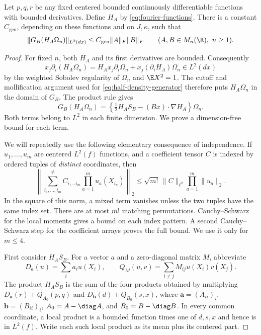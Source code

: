 \begin{lemma}
\label{lem:fourier-generator-bound}
Let $p,q,r$ be any fixed centered bounded continuously differentiable
functions with bounded derivatives.  Define $H_A$ by
\eqref{eq:fourier-functions}.  There is a constant $C_{\mathrm{gen}}$,
depending on these functions and on $J,\kappa$, such that
\begin{equation}
 \|G_B(H_A\Omega_n)\|_{L^2(dx)}
 \le C_{\mathrm{gen}}\|A\|_F\|B\|_F
 \qquad(A,B\in M_n(\R),\ n\ge1).
 \label{eq:coordinate-function-generator-bound}
\end{equation}
\end{lemma}

\begin{proof}
For fixed $n$, both $H_A$ and its first derivatives are bounded.
Consequently
\[
 x_j\partial_i(H_A\Omega_n)
 =H_Ax_j\partial_i\Omega_n
       +x_j(\partial_iH_A)\Omega_n\in L^2(dx)
\]
by the weighted Sobolev regularity of $\Omega_n$ and
$\E X^2=1$.  The cutoff and mollification argument used for
\eqref{eq:half-density-generator} therefore puts $H_A\Omega_n$
in the domain of $G_B$.
The product rule gives
\begin{equation}
 G_B(H_A\Omega_n)
 =\left\{\tfrac12H_AS_B-(Bx)\cdot\nabla H_A\right\}\Omega_n.
 \label{eq:coordinate-function-generator-product}
\end{equation}
Both terms belong to $L^2$ in each finite dimension.  We prove a
dimension-free bound for each term.

We will repeatedly use the following elementary consequence of
independence.  If $u_1,\ldots,u_m$ are centered $L^2(f)$ functions,
and a coefficient tensor $C$ is indexed by ordered tuples of
\emph{distinct} coordinates, then
\begin{equation}
 \left\|\sum_{i_1,\ldots,i_m}^{\ne}
 C_{i_1\ldots i_m}\prod_{a=1}^m u_a(X_{i_a})\right\|_2
 \le\sqrt{m!}\,\|C\|_{\ell^2}
                     \prod_{a=1}^m\|u_a\|_2.
 \label{eq:canonical-chaos-bound}
\end{equation}
In the square of this norm, a mixed term vanishes unless the two
tuples have the same index set.
There are at most $m!$ matching permutations.
Cauchy--Schwarz for the local moments gives a bound on each index
pattern.
A second Cauchy--Schwarz step for the coefficient arrays proves the
full bound.
We use it only for
$m\le4$.

First consider $H_AS_B$.  For a vector $a$ and a zero-diagonal
matrix $M$, abbreviate
\[
 D_a(u)=\sum_i a_i u(X_i),\qquad
 Q_M(u,v)=\sum_{i\ne j}M_{ij}u(X_i)v(X_j).
\]
The product $H_AS_B$ is the sum of the four products obtained by
multiplying $D_{\mathbf a}(r)+Q_{A_0}(p,q)$
and $D_{\mathbf b}(d)+Q_{B_0}(s,x)$, where
$\mathbf a=(A_{ii})_i$, $\mathbf b=(B_{ii})_i$,
$A_0=A-\diag A$, and
$B_0=B-\diag B$.
In every common coordinate, a local product is a bounded function
times one of $d,s,x$ and hence is in $L^2(f)$.  Write each such
local product as its mean plus its centered part.


\end{proof}
